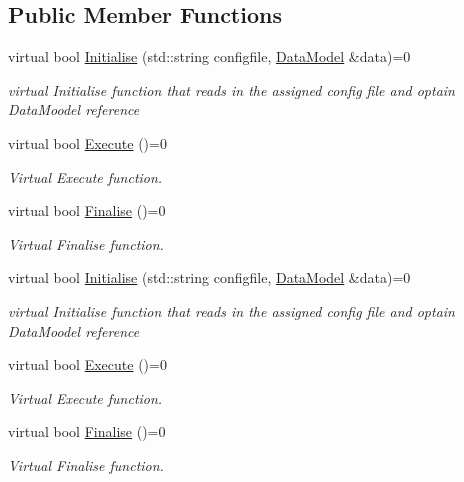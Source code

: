 \subsection*{Public Member Functions}
\begin{DoxyCompactItemize}
\item 
virtual bool \hyperlink{classTool_a4b04a99172dfe09dc97927d1feaff0ce}{Initialise} (std\-::string configfile, \hyperlink{classDataModel}{Data\-Model} \&data)=0
\begin{DoxyCompactList}\small\item\em virtual Initialise function that reads in the assigned config file and optain Data\-Moodel reference \end{DoxyCompactList}\item 
\hypertarget{classTool_a6a71469fa4efffd6fb71afbd4941e49d}{virtual bool \hyperlink{classTool_a6a71469fa4efffd6fb71afbd4941e49d}{Execute} ()=0}\label{classTool_a6a71469fa4efffd6fb71afbd4941e49d}

\begin{DoxyCompactList}\small\item\em Virtual Execute function. \end{DoxyCompactList}\item 
\hypertarget{classTool_a1f9a82fe5cc9afd63fc8eb3aaf5d80ca}{virtual bool \hyperlink{classTool_a1f9a82fe5cc9afd63fc8eb3aaf5d80ca}{Finalise} ()=0}\label{classTool_a1f9a82fe5cc9afd63fc8eb3aaf5d80ca}

\begin{DoxyCompactList}\small\item\em Virtual Finalise function. \end{DoxyCompactList}\item 
virtual bool \hyperlink{classTool_a4b04a99172dfe09dc97927d1feaff0ce}{Initialise} (std\-::string configfile, \hyperlink{classDataModel}{Data\-Model} \&data)=0
\begin{DoxyCompactList}\small\item\em virtual Initialise function that reads in the assigned config file and optain Data\-Moodel reference \end{DoxyCompactList}\item 
\hypertarget{classTool_a6a71469fa4efffd6fb71afbd4941e49d}{virtual bool \hyperlink{classTool_a6a71469fa4efffd6fb71afbd4941e49d}{Execute} ()=0}\label{classTool_a6a71469fa4efffd6fb71afbd4941e49d}

\begin{DoxyCompactList}\small\item\em Virtual Execute function. \end{DoxyCompactList}\item 
\hypertarget{classTool_a1f9a82fe5cc9afd63fc8eb3aaf5d80ca}{virtual bool \hyperlink{classTool_a1f9a82fe5cc9afd63fc8eb3aaf5d80ca}{Finalise} ()=0}\label{classTool_a1f9a82fe5cc9afd63fc8eb3aaf5d80ca}

\begin{DoxyCompactList}\small\item\em Virtual Finalise function. \end{DoxyCompactList}\end{DoxyCompactItemize}
